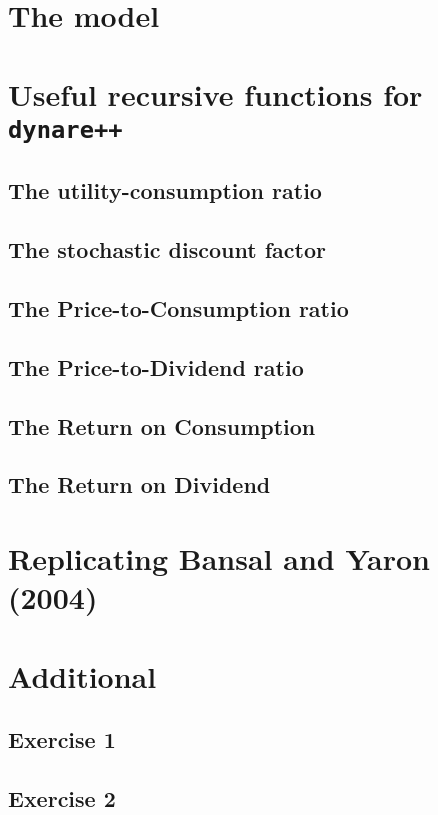 \documentclass[12pt]{article}
\begin{document}
	\maketitle

	\section{The model}
			

	
	\section{Useful recursive functions for \texttt{dynare++}}
	
		\subsection{The utility-consumption ratio}
			
		\subsection{The stochastic discount factor}
			
		\subsection{The Price-to-Consumption ratio}
			
		\subsection{The Price-to-Dividend ratio}
			
		\subsection{The Return on Consumption}
			
		\subsection{The Return on Dividend}
			
			
	\section{Replicating Bansal and Yaron (2004)}
			
	
	\section{Additional}
		\subsection{Exercise 1}
			
		\subsection{Exercise 2}
			
			
\end{document}

